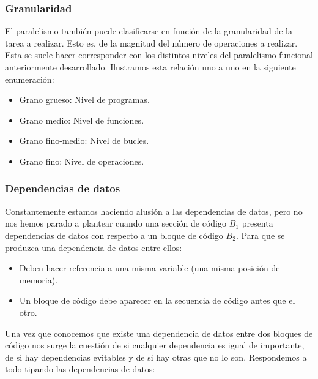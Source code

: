 \subsubsection{Granularidad}
El paralelismo también puede clasificarse en función de la granularidad de la tarea a realizar. Esto es, de la magnitud del número de operaciones a realizar. Esta se suele hacer corresponder con los distintos niveles del paralelismo funcional anteriormente desarrollado. Ilustramos esta relación uno a uno en la siguiente enumeración:
\begin{itemize}
    \item Grano grueso: Nivel de programas.
    \item Grano medio: Nivel de funciones.
    \item Grano fino-medio: Nivel de bucles.
    \item Grano fino: Nivel de operaciones.
\end{itemize}

\subsubsection{Dependencias de datos}
Constantemente estamos haciendo alusión a las dependencias de datos, pero no nos hemos parado a plantear cuando una sección de código $B_1$ presenta dependencias de datos con respecto a un bloque de código $B_2$. Para que se produzca una dependencia de datos entre ellos:
\begin{itemize}
    \item Deben hacer referencia a una misma variable (una misma posición de memoria).
    \item Un bloque de código debe aparecer en la secuencia de código antes que el otro.
\end{itemize}

Una vez que conocemos que existe una dependencia de datos entre dos bloques de código nos surge la cuestión de si cualquier dependencia es igual de importante, de si hay dependencias evitables y de si hay otras que no lo son. Respondemos a todo tipando las dependencias de datos:

